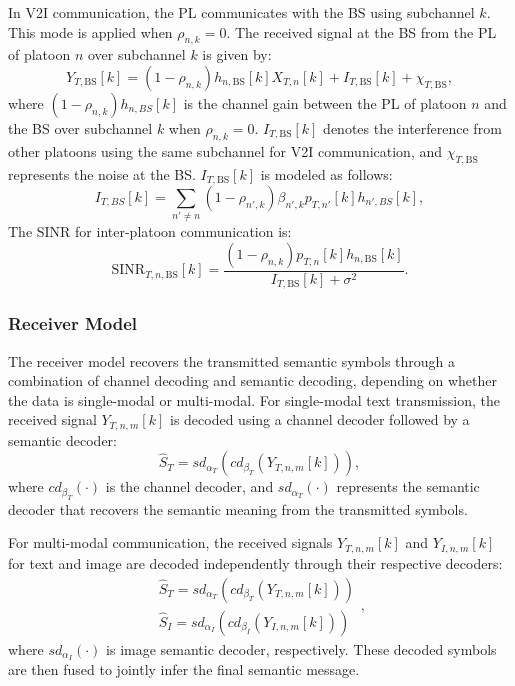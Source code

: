 \documentclass[10pt, lettersize,journal]{IEEEtran}
\begin{document}
	In V2I communication, the PL communicates with the BS using subchannel \(k\). This mode is applied when \(\rho_{n,k} = 0\). The received signal at the BS from the PL of platoon \(n\) over subchannel \(k\) is given by:
	\begin{equation}\label{eq3}
		Y_{T, \text{BS}}[k] = (1 - \rho_{n,k}) h_{n, \text{BS}}[k] X_{T, n}[k] + I_{T, \text{BS}}[k] + \chi _{T, \text{BS}},
	\end{equation} 
	where $(1 - \rho_{n,k}) h_{n, BS}[k]$ is the channel gain between the PL of platoon $n$ and the BS over subchannel $k$ when \(\rho_{n,k} = 0\). 
	\(I_{T, \text{BS}}[k]\) denotes the interference from other platoons using the same subchannel for V2I communication, and $\chi _{T, \text{BS}}$ represents the noise at the BS. \(I_{T, \text{BS}}[k]\) is modeled as follows:
	\begin{equation}\label{eq40}
		{I_{T,BS}}[k] = \sum\limits_{n' \ne n} {{(1 - \rho _{n',k})}{\beta _{n',k}}} {p_{T,n'}}[k]{h_{n',BS}}[k],
	\end{equation}
	The SINR for inter-platoon communication is: 
	\begin{equation}\label{eq40}
		\text{SINR}_{T,n,\text{BS}}[k] = \frac{(1 - \rho_{n,k}) p_{T,n}[k] h_{n, \text{BS}}[k]}{I_{T, \text{BS}}[k] + \sigma^2}.
	\end{equation} 

	\subsubsection{Receiver Model}
	The receiver model recovers the transmitted semantic symbols through a combination of channel decoding and semantic decoding, depending on whether the data is single-modal or multi-modal. 
	For single-modal text transmission, the received signal $Y_{T, n, m}[k]$ is decoded using a channel decoder followed by a semantic decoder: 
	\begin{equation}\label{eq_rx_single} 
		{{\hat S}_T} = s{d_{{\alpha _T}}}(c{d_{{\beta _T}}}({Y_{T,n,m}}[k])), 
	\end{equation} 
	where $c{d_{{\beta _T}}}( \cdot )$ is the channel decoder, and $s{d_{{\alpha _T}}}( \cdot )$ represents the semantic decoder that recovers the semantic meaning from the transmitted symbols.
	
	For multi-modal communication, the received signals $Y_{T, n, m}[k]$ and $Y_{I, n, m}[k]$ for text and image are decoded independently through their respective decoders: \begin{equation}\label{eq_rx_multi} \begin{array}{l}
			{{\hat S}_T} = s{d_{{\alpha _T}}}(c{d_{{\beta _T}}}({Y_{T,n,m}}[k]))\\
			{{\hat S}_I} = s{d_{{\alpha _I}}}(c{d_{{\beta _I}}}({Y_{I,n,m}}[k]))
		\end{array},
	\end{equation} 
	where $s{d_{{\alpha _I}}}( \cdot )$ is image semantic decoder, respectively. These decoded symbols are then fused to jointly infer the final semantic message.
	
\end{document}
